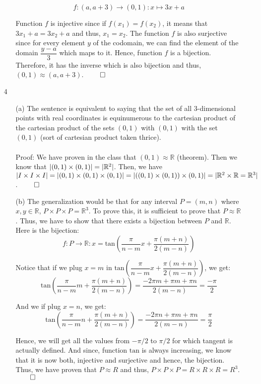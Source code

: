 \documentclass[12pt, a4paper]{article}
\newcommand{\reals}{\mathbb{R}}
\DeclarePairedDelimiter\abs{\lvert}{\rvert}
\newcommand{\rarr}{\rightarrow}
\begin{document}
\begin{itemize}
\begin{itemize}
$$f : (a, a + 3) \rarr (0, 1) : x \mapsto 3x + a$$

Function $f$ is injective since if $f(x_1) = f(x_2)$, it means that $3x_1 + a = 3x_2 + a$ and thus, $x_1 = x_2$.
The function $f$ is also surjective since for every element $y$ of the codomain, we can find the element of the domain $\dfrac{y - a}{3}$
which maps to it. Hence, function $f$ is a bijection. Therefore, it has the inverse which is also bijection and thus, $(0, 1) \approx (a, a + 3)$.
$\qed$
\end{itemize}

\item[]

\item[4]
\begin{itemize}
\item[(a)]
The sentence is equivalent to saying that the set of all 3-dimensional points with real coordinates is equinumerous
to the cartesian product of the cartesian product of the sets $(0, 1)$ with $(0, 1)$ with the set $(0, 1)$ (sort of cartesian product taken thrice).
\\\\
Proof: We have proven in the class that $(0, 1) \approx \reals$ (theorem). Then we know that $\abs{(0, 1) \times (0, 1)} = \abs{\reals^2}$.
Then, we have $\abs{I \times I \times I} = \abs{(0, 1) \times (0, 1) \times (0, 1)} = \abs{((0, 1) \times (0, 1)) \times (0, 1)} = \abs{\reals^2 \times \reals = \reals^3}$.
$\qed$
\item[(b)]
The generalization would be that for any interval $P = (m, n)$ where $x, y \in \reals$,
$P \times P \times P = \reals^3$. To prove this, it is sufficient to prove that $P \approx \reals$.
Thus, we have to show that there exists a bijection between $P$ and $\reals$.
Here is the bijection:
$$f : P \rarr \reals : x = \mbox{tan}(\dfrac{\pi}{n - m}x + \dfrac{\pi(m + n)}{2(m - n)})$$

Notice that if we plug $x = m$ in $\mbox{tan}(\dfrac{\pi}{n - m}x + \dfrac{\pi(m + n)}{2(m - n)})$,
we get:
$$\mbox{tan}(\dfrac{\pi}{n - m}m + \dfrac{\pi(m + n)}{2(m - n)}) = \dfrac{-2\pi m + \pi m + \pi n}{2(m - n)} = \dfrac{-\pi}{2}$$

And we if plug $x = n$, we get:
$$\mbox{tan}(\dfrac{\pi}{n - m}n + \dfrac{\pi(m + n)}{2(m - n)}) = \dfrac{-2\pi n + \pi m + \pi n}{2(m - n)} = \dfrac{\pi}{2}$$

Hence, we will get all the values from $-\pi/2$ to $\pi/2$ for which tangent is actually defined.
And since, function $\mbox{tan}$ is always increasing, we know that it is now both, injective and surjective and hence, the bijection.
Thus, we have proven that $P \approx R$ and thus, $P \times P \times P = R \times R \times R = R^3$.
$\qed$
\end{itemize}


\end{itemize}
\end{document}
